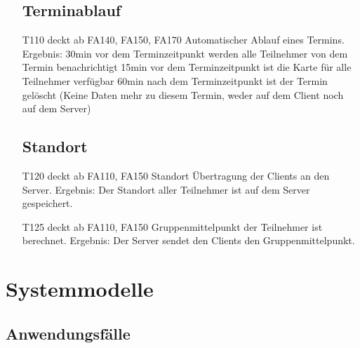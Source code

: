 \documentclass{scrartcl}
\begin{document}
\begin{itemize}
	\subsection{Terminablauf}
	
		\item[T110] deckt ab FA140, FA150, FA170 \newline
		Automatischer Ablauf eines Termins. \newline
		Ergebnis: 30min vor dem Terminzeitpunkt werden alle \gls{Teilnehmer} von dem Termin benachrichtigt  \newline
			15min vor dem Terminzeitpunkt ist die Karte für alle Teilnehmer verfügbar  \newline
			60min nach dem Terminzeitpunkt ist der Termin gelöscht (Keine Daten mehr zu diesem Termin, weder auf 					dem \gls{Client} noch auf dem \gls{Server})

	\subsection{Standort}
		\item[T120] deckt ab FA110, FA150 \newline
		Standort Übertragung der Clients an den \gls{Server}.  \newline
		Ergebnis: Der Standort aller \gls{Teilnehmer} ist auf dem Server gespeichert.

		\item[T125]  deckt ab FA110, FA150 \newline
		Gruppenmittelpunkt der \gls{Teilnehmer} ist berechnet. \newline
		Ergebnis: Der \gls{Server} sendet den Clients den Gruppenmittelpunkt.

	\end{itemize}	
	
	\newpage
	
	
	\section{Systemmodelle}
	
	\subsection{Anwendungsfälle}
\end{document}
